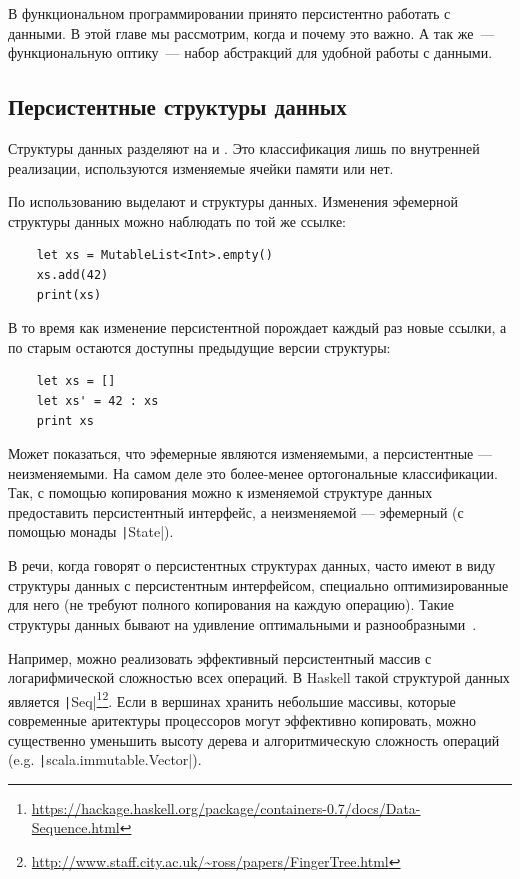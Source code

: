 

В функциональном программировании принято персистентно работать с данными.
В этой главе мы рассмотрим, когда и почему это важно.
А так же~--- функциональную оптику~--- набор абстракций для удобной работы с данными.

\subsection{Персистентные структуры данных}

Структуры данных разделяют на  и .
Это классификация лишь по внутренней реализации, используются изменяемые ячейки памяти или нет.

По использованию выделают  и  структуры данных. %
Изменения эфемерной структуры данных можно наблюдать по той же ссылке:
\begin{verbatim}
    let xs = MutableList<Int>.empty()
    xs.add(42)
    print(xs)
\end{verbatim}
В то время как изменение персистентной порождает каждый раз новые ссылки, а по старым остаются доступны предыдущие версии структуры:
\begin{verbatim}
    let xs = []
    let xs' = 42 : xs
    print xs
\end{verbatim}

Может показаться, что эфемерные являются изменяемыми, а персистентные --- неизменяемыми.
На самом деле это более-менее ортогональные классификации.
Так, с помощью копирования можно к изменяемой структуре данных предоставить персистентный интерфейс, а неизменяемой --- эфемерный (с помощью монады \texttt|State|).

В речи, когда говорят о персистентных структурах данных, часто имеют в виду структуры данных с персистентным интерфейсом, специально оптимизированные для него (не требуют полного копирования на каждую операцию).
Такие структуры данных бывают на удивление оптимальными и разнообразными~\cite{okasaki1999purely}.

Например, можно реализовать эффективный персистентный массив с логарифмической сложностью всех операций.
В Haskell такой структурой данных является \texttt|Seq|\footnote{\url{https://hackage.haskell.org/package/containers-0.7/docs/Data-Sequence.html}}\footnote{\url{http://www.staff.city.ac.uk/~ross/papers/FingerTree.html}}.
Если в вершинах хранить небольшие массивы, которые современные аритектуры процессоров могут эффективно копировать, можно существенно уменьшить высоту дерева и алгоритмическую сложность операций (e.g. \texttt|scala.immutable.Vector|).


